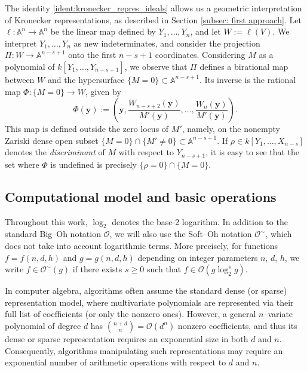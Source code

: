 \documentclass[pdflatex,sn-basic]{sn-jnl}%
\theoremstyle{thmstyleone}%
\theoremstyle{thmstyletwo}%
\theoremstyle{thmstylethree}%
\theoremstyle{definition}
\numberwithin{equation}{section}
\newcommand{\bfs}{\boldsymbol}
\newcommand{\A}{\mathbb A}
\begin{document}
The identity \eqref{ident:kronecker_repres_ideals} allows us a
geometric interpretation of Kronecker representations, as described
in Section \ref{subsec: first approach}. Let $\ell:\mathbb{A}^n\rightarrow
\mathbb{A}^n$ be the linear map defined by $Y_1,\dots,Y_n$, and let
$W:=\ell(V)$. We interpret $Y_1,\dots, Y_n$ as new indeterminates,
and consider the projection $\Pi:W\rightarrow \mathbb{A}^{n-s+1}$
onto the first $n-s+1$ coordinates.
Considering $M$ as a polynomial of $k[Y_1,\dots,Y_{n-s+1}]$, we
observe that $\Pi$ defines a birational map between $W$ and the
hypersurface $\{M=0\}\subset\mathbb{A}^{n-s+1}$. Its inverse is the
rational map $\Phi:\{M=0\}\rightarrow W$, given by
%
$$\Phi(\bfs y):=\left(\bfs y,
\frac{W_{n-s+2}(\bfs y)}{M'(\bfs y)}, \dots, \frac{W_n(\bfs
y)}{M'(\bfs y)}\right).$$
%
This map is defined  outside
the zero locus of $M'$, namely, on the nonempty Zariski dense open
subset $\{M=0\}\cap\{M'\not=0\}\subset\A^{n-s+1}$. If $\rho\in k[Y_1,\ldots,X_{n-s}]$
denotes the {\em discriminant} of $M$ with respect to $Y_{n-s+1}$,
it is easy to see that the set where $\Phi$ is undefined is
precisely $\{\rho=0\}\cap\{M=0\}$.
%
%
\subsection{Computational model and basic operations}
%
Throughout this work, $\log_2$ denotes the base-2 logarithm. In addition
to the standard Big--Oh notation $\mathcal{O}$, we will also use the Soft--Oh
notation $\mathcal{O}^\sim$, which does not take into
account logarithmic terms. %
More precisely, for functions $f=f(n,d,h)$ and $g=g(n,d,h)$ depending on
integer parameters $n$, $d$, $h$, we write
$f\in \mathcal{O}^\sim(g)$ if there exists $s\ge 0$ such that
$f\in \mathcal{O}(g\log_2^sg)$.

In computer algebra, algorithms often assume the standard dense
(or sparse) representation model, where multivariate polynomials are
represented via their full list of coefficients (or only the nonzero
ones). However, a general $n$--variate polynomial of
degree $d$ has $\binom{n + d}{n}=\mathcal{O}(d^n)$ nonzero
coefficients, and thus its dense or sparse representation requires an
exponential size in both $d$ and $n$. Consequently, algorithms
manipulating such representations may require an exponential number of
arithmetic operations with respect to $d$ and $n$.
\end{document}
